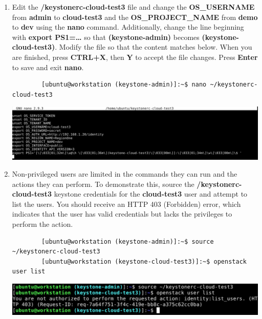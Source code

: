 \documentclass[letterpaper, 12pt]{article}
\begin{document}
\begin{enumerate}
    \item Edit the \textbf{\texttildemid/keystonerc-cloud-test3} file and change the \textbf{OS\_USERNAME} from \textbf{admin} to \textbf{cloud-test3} and the \textbf{OS\_PROJECT\_NAME} from \textbf{demo} to \textbf{dev} using the \textbf{nano} command.
    Additionally, change the line beginning with \textbf{export PS1=…} so that \textbf{(keystone-admin)} becomes \textbf{(keystone-cloud-test3)}.
    Modify the file so that the content matches below.
    When you are finished, press \textbf{CTRL+X}, then \textbf{Y} to accept the file changes.
    Press \textbf{Enter} to save and exit \textbf{nano}.
    \label{it:edit_keystone}
    \begin{lstlisting}
        [ubuntu@workstation (keystone-admin)]:~$ nano ~/keystonerc-cloud-test3
    \end{lstlisting}

    \begin{center}
        \includegraphics[width=\linewidth]{images/part4/step12.png}
    \end{center}

    \item Non-privileged users are limited in the commands they can run and the actions they can perform.
    To demonstrate this, source the \textbf{\texttildemid/keystonerc-cloud-test3} keystone credentials for the \textbf{cloud-test3} user and attempt to list the users.
    You should receive an HTTP 403 (Forbidden) error, which indicates that the user has valid credentials but lacks the privileges to perform the action.
    \begin{lstlisting}
        [ubuntu@workstation (keystone-admin)]:~$ source ~/keystonerc-cloud-test3
        [ubuntu@workstation (keystone-cloud-test3)]:~$ openstack user list
    \end{lstlisting}

    \begin{center}
        \includegraphics[width=\linewidth]{images/part4/step13.png}
    \end{center}


\end{enumerate}
\end{document}
